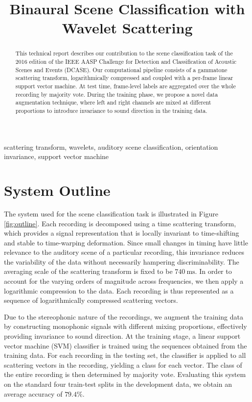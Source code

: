 \documentclass{article}
\title{Binaural Scene Classification with Wavelet Scattering}
\begin{document}
\ninept
\maketitle

\begin{sloppy}

\begin{abstract}
This technical report describes our contribution to the scene classification task of the 2016 edition of the IEEE AASP Challenge for Detection and Classification of Acoustic Scenes and Events (DCASE). Our computational pipeline consists of a gammatone scattering transform, logarithmically compressed and coupled with a per-frame linear support vector machine. At test time, frame-level labels are aggregated over the whole recording by majority vote. During the training phase, we propose a novel data augmentation technique, where left and right channels are mixed at different proportions to introduce invariance to sound direction in the training data.
\end{abstract}

\begin{keywords}
scattering transform, wavelets, auditory scene classification, orientation invariance, support vector machine
\end{keywords}

\section{System Outline}
\label{sec:outline}
The system used for the scene classification task is illustrated in Figure \ref{fig:outline}. Each recording is decomposed using a time scattering transform, which provides a signal representation that is locally invariant to time-shifting and stable to time-warping deformation. Since small changes in timing have little relevance to the auditory scene of a particular recording, this invariance reduces the variability of the data without necessarily hampering discriminability. The averaging scale of the scattering transform is fixed to be $740~\mathrm{ms}$. In order to account for the varying orders of magnitude across frequencies, we then apply a logarithmic compression to the data. Each recording is thus represented as a sequence of logarithmically compressed scattering vectors.

Due to the stereophonic nature of the recordings, we augment the training data by constructing monophonic signals with different mixing proportions, effectively providing invariance to sound direction. At the training stage, a linear support vector machine (SVM) classifier is trained using the sequences obtained from the training data. For each recording in the testing set, the classifier is applied to all scattering vectors in the recording, yielding a class for each vector. The class of the entire recording is then determined by majority vote. Evaluating this system on the standard four train-test splits in the development data, we obtain an average accuracy of $79.4\%$.


\end{sloppy}
\end{document}
